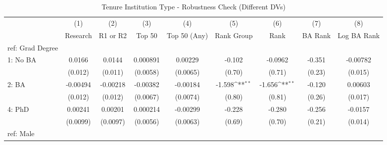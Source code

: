 \begin{table}[htbp]\centering
\def\sym#1{\ifmmode^{#1}\else\(^{#1}\)\fi}
\caption{Tenure Institution Type - Robustness Check (Different DVs) \label{tab1}}
\begin{tabular}{l*{8}{c}}
\hline\hline
  &\multicolumn{1}{c}{(1)}&\multicolumn{1}{c}{(2)}&\multicolumn{1}{c}{(3)}&\multicolumn{1}{c}{(4)}&\multicolumn{1}{c}{(5)}&\multicolumn{1}{c}{(6)}&\multicolumn{1}{c}{(7)}&\multicolumn{1}{c}{(8)}\\
  &\multicolumn{1}{c}{Research}&\multicolumn{1}{c}{R1 or R2}&\multicolumn{1}{c}{Top 50}&\multicolumn{1}{c}{Top 50 (Any)}&\multicolumn{1}{c}{Rank Group}&\multicolumn{1}{c}{Rank}&\multicolumn{1}{c}{BA Rank}&\multicolumn{1}{c}{Log BA Rank}\\
\hline
ref: Grad Degree&                     &                     &                     &                     &                     &                     &                     &                     \\
[1em]
1: No BA&      0.0166         &      0.0144         &    0.000891         &     0.00229         &      -0.102         &     -0.0962         &      -0.351         &    -0.00782         \\
  &     (0.012)         &     (0.011)         &    (0.0058)         &    (0.0065)         &      (0.70)         &      (0.71)         &      (0.23)         &     (0.015)         \\
[1em]
2: BA&    -0.00494         &    -0.00218         &    -0.00382         &    -0.00184         &      -1.598\sym{**} &      -1.656\sym{**} &      -0.120         &     0.00603         \\
  &     (0.012)         &     (0.012)         &    (0.0067)         &    (0.0074)         &      (0.80)         &      (0.81)         &      (0.26)         &     (0.017)         \\
[1em]
4: PhD&     0.00241         &     0.00201         &    0.000214         &    -0.00299         &      -0.228         &      -0.280         &      -0.256         &     -0.0157         \\
  &    (0.0099)         &    (0.0097)         &    (0.0056)         &    (0.0063)         &      (0.69)         &      (0.70)         &      (0.21)         &     (0.014)         \\
[1em]
ref: Male&                     &                     &                     &                     &                     &                     &                     &                     \\

\end{tabular}
\end{table}

